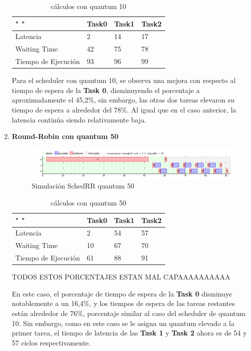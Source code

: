 \documentclass[11pt]{article}
\begin{document}
\begin{enumerate}
  \begin{table}[htb]
  \centering
  \begin{tabular}{| l | l | l | l |}
  \hline
  " " & Task0 & Task1 & Task2 \\
  \hline \hline
  Latencia & 2 & 14 & 17 \\ \hline
  Waiting Time & 42 & 75 & 78 \\ \hline
  Tiempo de Ejecución & 93 & 96 & 99 \\ \hline
  \end{tabular}
  \caption{cálculos con quantum 10}
  \end{table}

  Para el scheduler con quantum 10, se observa una mejora con respecto al tiempo de espera de la \textbf{Task 0}, disminuyendo el porcentaje a aproximadamente el 45,2\%, sin embargo, las otras dos tareas elevaron su tiempo de espera a alrededor del 78\%. Al igual que en el caso anterior, la latencia continúa siendo relativamente baja.

  \item \textbf{Round-Robin con quantum 50}

        \begin{figure}[H]
          \includegraphics[scale=0.5]{Ej5q50}
          \caption{Simulación SchedRR quantum 50}
        \end{figure}

  \begin{table}[htb]
  \centering
  \begin{tabular}{| l | l | l | l |}
  \hline
  " " & Task0 & Task1 & Task2 \\
  \hline \hline
  Latencia & 2 & 54 & 57 \\ \hline
  Waiting Time & 10 & 67 & 70 \\ \hline
  Tiempo de Ejecución & 61 & 88 & 91 \\ \hline
  \end{tabular}
  \caption{cálculos con quantum 50}
  \end{table}

  TODOS ESTOS PORCENTAJES ESTAN MAL CAPAAAAAAAAAA

  En este caso, el porcentaje de tiempo de espera de la \textbf{Task 0} disminuye notablemente a un 16,4\%, y los tiempos de espera de las tareas restantes están alrededor de 76\%, porcentaje similar al caso del scheduler de quantum 10. Sin embargo, como en este caso se le asigna un quantum elevado a la primer tarea, el tiempo de latencia de las \textbf{Task 1} y \textbf{Task 2} ahora es de 54 y 57 ciclos respectivamente. 
  \end{enumerate}
\end{document}
